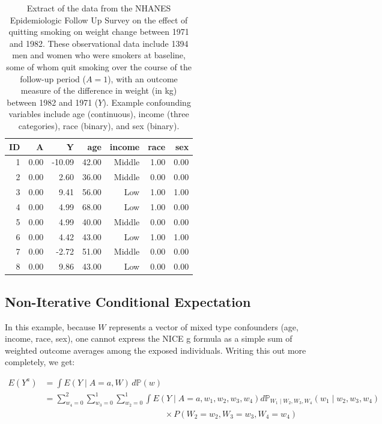 \documentclass[12pt]{article}
\numberwithin{equation}{section}
\begin{document}
\begin{table}[ht]
\centering
	\begin{tabular}{rrrrrrr}
  \hline
 ID & A & Y & age & income & race & sex \\ 
  \hline
  1 & 0.00 & -10.09 & 42.00 & Middle & 1.00 & 0.00 \\ 
  2 & 0.00 & 2.60 & 36.00 & Middle & 0.00 & 0.00  \\ 
  3 & 0.00 & 9.41 & 56.00 & Low    & 1.00 & 1.00 \\ 
  4 & 0.00 & 4.99 & 68.00 & Low    & 1.00 & 0.00 \\ 
  5 & 0.00 & 4.99 & 40.00 & Middle & 0.00 & 0.00 \\ 
  6 & 0.00 & 4.42 & 43.00 & Low    & 1.00 & 1.00 \\ 
  7 & 0.00 & -2.72 & 51.00 & Middle & 0.00 & 0.00 \\ 
  8 & 0.00 & 9.86 & 43.00 & Low    & 0.00 & 0.00 \\  
   \hline
 	\end{tabular}
	\caption{Extract of the data from the NHANES Epidemiologic Follow Up Survey on the effect of quitting smoking on weight change between 1971 and 1982. These observational data include 1394 men and women who were smokers at baseline, some of whom quit smoking over the course of the follow-up period ($A = 1$), with an outcome measure of the difference in weight (in kg) between 1982 and 1971 ($Y$). Example confounding variables include age (continuous), income (three categories), race (binary), and sex (binary).}
   \label{tab:nhefs_data}
\end{table}

\subsection{Non-Iterative Conditional Expectation}

In this example, because $W$ represents a vector of mixed type confounders (age, income, race, sex), one cannot express the NICE g formula as a simple sum of weighted outcome averages among the exposed individuals. Writing this out more completely, we get:

\begin{align*}
E(Y^a) & = \int E(Y \mid A = a, W)\,d\mathbb{P}(w) \\
	   & =	\sum_{w_4=0}^{2}\sum_{w_3=0}^{1}\sum_{w_2=0}^{1}\int E(Y \mid A=a, w_1, w_2, w_3, w_4) d\mathbb{P}_{W_1\mid W_2, W_3, W_4}(w_1 \mid w_2, w_3, w_4)\\ 
	   & \hspace{6cm} \times P(W_2=w_2, W_3=w_3, W_4=w_4)
\end{align*}
\end{document}

